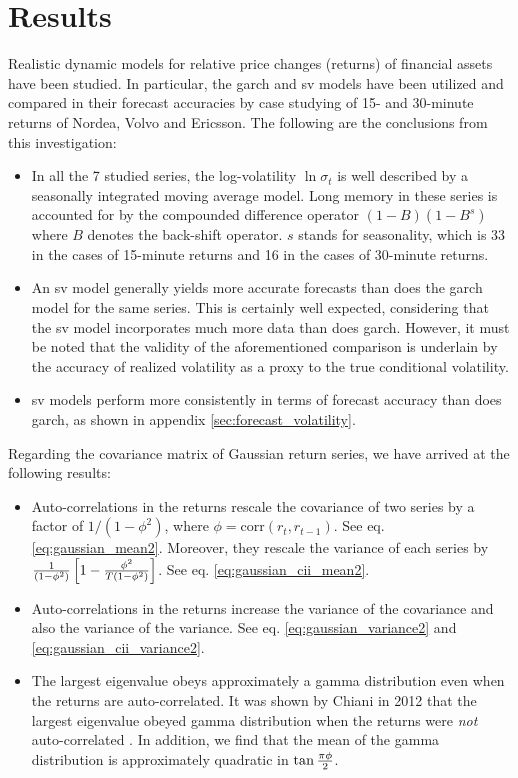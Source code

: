 \chapter{Results}
\label{chp:summary}
Realistic dynamic models for relative price changes (returns) of
financial assets have been studied. In particular, the \gls{garch} and
\gls{sv} models have been utilized and compared in their forecast
accuracies by case studying of 15- and 30-minute returns of Nordea,
Volvo and Ericsson. The following are the conclusions from this
investigation:
\begin{itemize}
\item In all the 7 studied series, the log-volatility $\ln \sigma_t$
  is well described by a seasonally integrated moving average
  model. Long memory in these series is accounted for by the compounded
  difference operator $(1-B)(1-B^s)$ where $B$ denotes the back-shift
  operator. $s$ stands for seasonality, which is 33 in the cases of
  15-minute returns and 16 in the cases of 30-minute returns.

\item An \gls{sv} model generally yields more accurate forecasts than does
  the \gls{garch} model for the same series. This is certainly well expected,
  considering that the \gls{sv} model incorporates much more data than does
  \gls{garch}. However, it must be noted that the validity of the
  aforementioned comparison is underlain by the accuracy of realized
  volatility as a proxy to the true conditional volatility.

\item \gls{sv} models perform more consistently in terms of forecast
  accuracy than does \gls{garch}, as shown in appendix
  \ref{sec:forecast_volatility}.
\end{itemize}

Regarding the covariance matrix of Gaussian return series, we have
arrived at the following results:
\begin{itemize}
\item Auto-correlations in the returns rescale the covariance of two
  series by a factor of $1/(1 - \phi^2)$, where $\phi =
  \text{corr}(r_t, r_{t-1})$. See
  eq. \ref{eq:gaussian_mean2}. Moreover, they rescale the variance of
  each series by ${1 \over (1 - \phi^2)}\left[
    1- {\phi^2 \over T(1 - \phi^2)}
  \right]$. See eq. \ref{eq:gaussian_cii_mean2}.

\item Auto-correlations in the returns increase the variance of the
  covariance and also the variance of the variance. See
  eq. \ref{eq:gaussian_variance2} and
  \ref{eq:gaussian_cii_variance2}.

\item The largest eigenvalue obeys approximately a gamma distribution
  even when the returns are auto-correlated. It was shown by Chiani in
  2012 that the largest eigenvalue obeyed gamma distribution when the
  returns were {\it not} auto-correlated \cite{Chiani2012}. In
  addition, we find that the mean of the gamma distribution is
  approximately quadratic in $\tan{\pi\phi \over 2}$.
\end{itemize}

